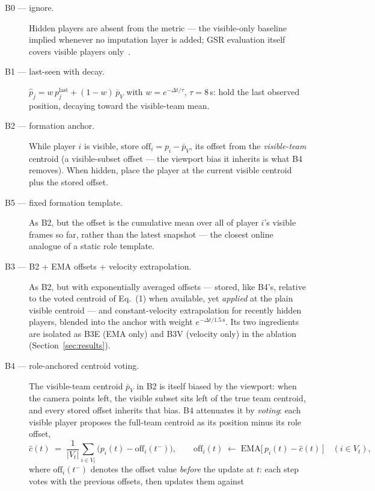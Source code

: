 \documentclass[11pt]{article}
\begin{document}
\begin{description}
\item[B0 --- ignore.] Hidden players are absent from the metric --- the
visible-only baseline implied whenever no imputation layer is added; GSR
evaluation itself covers visible players only~\citep{somers2024soccernet}.
\item[B1 --- last-seen with decay.] $\hat{p}_j = w\,p_j^{\mathrm{last}} +
(1-w)\,\bar{p}_V$ with $w = e^{-\Delta t/\tau}$, $\tau = 8$\,s: hold the last
observed position, decaying toward the visible-team mean.
\item[B2 --- formation anchor.] While player $i$ is visible, store
$\mathrm{off}_i = p_i - \bar{p}_{V}$, its offset from the \emph{visible-team}
centroid (a visible-subset offset --- the viewport bias it inherits is what B4
removes). When hidden, place the player at the current visible centroid plus
the stored offset.
\item[B5 --- fixed formation template.] As B2, but the offset is the
cumulative mean over all of player $i$'s visible frames so far, rather than
the latest snapshot --- the closest online analogue of a static role template.
\item[B3 --- B2 + EMA offsets + velocity extrapolation.] As B2, but with
exponentially averaged offsets --- stored, like B4's, relative to the voted
centroid of Eq.~(1) when available, yet \emph{applied} at the plain visible
centroid --- and constant-velocity extrapolation for recently hidden players,
blended into the anchor with weight $e^{-\Delta t/1.5\,\mathrm{s}}$.
Its two ingredients are isolated as B3E (EMA only) and B3V (velocity only) in
the ablation (Section~\ref{sec:results}).
\item[B4 --- role-anchored centroid voting.] The visible-team centroid
$\bar{p}_{V}$ in B2 is itself biased by the viewport: when the camera points
left, the visible subset sits left of the true team centroid, and every stored
offset inherits that bias. B4 attenuates it by \emph{voting}: each visible player
proposes the full-team centroid as its position minus its role offset,
\begin{equation}
\hat{c}(t) \;=\; \frac{1}{|V_t|}\sum_{i \in V_t}\bigl(p_i(t) - \mathrm{off}_i(t^-)\bigr),
\qquad
\mathrm{off}_i(t) \;\leftarrow\; \mathrm{EMA}\bigl[\,p_i(t) - \hat{c}(t)\,\bigr]
\quad (i \in V_t),
\end{equation}
where $\mathrm{off}_i(t^-)$ denotes the offset value \emph{before} the update
at $t$: each step votes with the previous offsets, then updates them against

\end{description}
\end{document}
